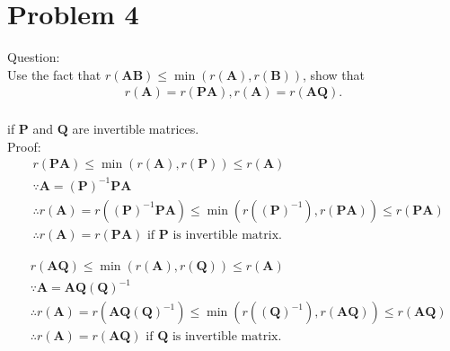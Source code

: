 \documentclass{article}
\begin{document}
\section{Problem 4}
Question:\\
Use the fact that $r(\bm{AB})\leq \min(r(\bm{A}), r(\bm{B}))$, show that\\
\begin{align*}
  r(\bm{A})=r(\bm{PA}), r(\bm{A})=r(\bm{AQ})
  .
  \end{align*}\\
if $\bm{P}$ and $\bm{Q}$ are invertible matrices.\\
Proof:\\
\begin{align*}
  &r(\bm{PA})\leq \min(r(\bm{A}),r(\bm{P}))\leq r(\bm{A})\\
  &\because \bm{A}=(\bm{P})^{-1}\bm{PA}\\
  &\therefore r(\bm{A})=r((\bm{P})^{-1}\bm{PA})\leq
  \min(r((\bm{P})^{-1}),r(\bm{PA}))\leq r(\bm{PA})\\
  &\therefore r(\bm{A})=r(\bm{PA})\text{ if }\bm{P}\text{ is
    invertible matrix}
  .
  \end{align*}
  
\begin{align*}
  &r(\bm{AQ})\leq \min(r(\bm{A}),r(\bm{Q}))\leq r(\bm{A})\\
  &\because \bm{A}=\bm{AQ} (\bm{Q})^{-1}\\
  &\therefore r(\bm{A})=r(\bm{AQ}(\bm{Q})^{-1})\leq
  \min(r((\bm{Q})^{-1}),r(\bm{AQ}))\leq r(\bm{AQ})\\
  &\therefore r(\bm{A})=r(\bm{AQ})\text{ if }\bm{Q}\text{ is
    invertible matrix}
  .
  \end{align*}
  
      
          
\end{document}
